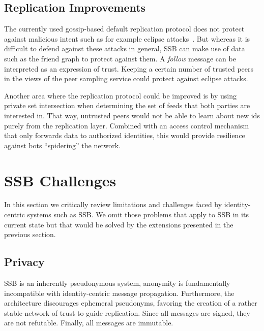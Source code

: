 \documentclass[10pt,sigconf,rewiew]{acmart}
\begin{document}
\subsection{Replication Improvements}

The currently used gossip-based default replication protocol does not protect against malicious intent such as for example eclipse attacks~\cite{singh2006eclipse}. But whereas it is difficult to defend against these attacks in general, SSB can make use of data such as the friend graph to protect against them. A \textit{follow} message can be interpreted as an expression of trust. Keeping a certain number of trusted peers in the views of the peer sampling service could protect against eclipse attacks.

Another area where the replication protocol could be improved is by using private set intersection when determining the set of feeds that both parties are interested in. That way, untrusted peers would not be able to learn about new ids purely from the replication layer. Combined with an access control mechanism that only forwards data to authorized identities, this would provide resilience against bots ``spidering'' the network.

%

\section{SSB Challenges}
\label{sect:nay}


In this section we critically review limitations and challenges faced by identity-centric systems such as SSB. We omit those problems that apply to SSB in its current state but that would be solved by the extensions presented in the previous section.

\subsection{Privacy}

SSB is an inherently pseudonymous system, anonymity is fundamentally incompatible with identity-centric message propagation. Furthermore, the architecture discourages ephemeral pseudonyms, favoring the creation of a rather stable network of trust to guide replication. Since all messages are signed, they are not refutable. Finally, all messages are immutable.
\end{document}
